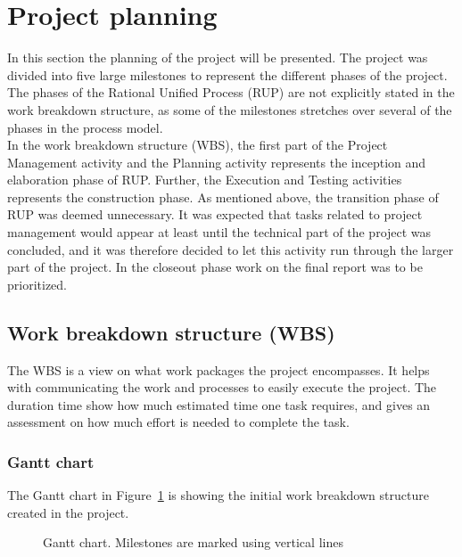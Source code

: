 \section{Project planning}
\label{projectplanning}
In this section the planning of the project will be presented. The project was divided into five large milestones to represent the different phases of the project. The phases of the Rational Unified Process (RUP) are not explicitly stated in the work breakdown structure, as some of the milestones stretches over several of the phases in the process model. \\
\newline
In the work breakdown structure (WBS), the first part of the Project Management activity and the Planning activity represents the inception and elaboration phase of RUP. Further, the Execution and Testing activities represents the construction phase. As mentioned above, the transition phase of RUP was deemed unnecessary. It was expected that tasks related to project management would appear at least until the technical part of the project was concluded, and it was therefore decided to let this activity run through the larger part of the project. In the closeout phase work on the final report was to be prioritized.

\subsection{Work breakdown structure (WBS)}
The WBS is a view on what work packages the project encompasses. It helps with communicating the work and processes to easily execute the project. The duration time show how much estimated time one task requires, and gives an assessment on how much effort is needed to complete the task.

\subsubsection{Gantt chart}
The Gantt chart in Figure~\ref{fig:gantt} is showing the initial work breakdown structure created in the project.
\begin{figure}[H]

\caption[Gant chart]{Gantt chart. Milestones are marked using vertical lines}
\label{fig:gantt}
\end{figure}


